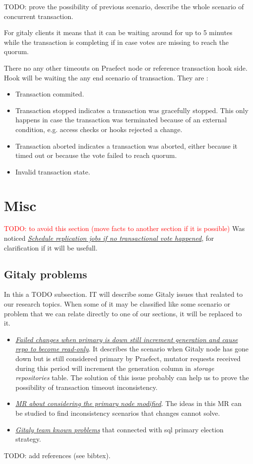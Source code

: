 \documentclass[acmlarge, screen, nonacm]{acmart}
\newcommand{\todo}[1]{\textcolor{red}{TODO: #1}}
\begin{document}
TODO: prove the possibility of previous scenario, describe the whole scenario of concurrent transaction.

For gitaly clients it means that it can be waiting around for up to 5 minutes while the transaction 
is completing if in case votes are missing to reach the quorum.

There no any other timeouts on Praefect node or reference transaction hook side. 
Hook will be waiting the any end scenario of transaction. They are :

\begin{itemize}
\item Transaction commited.
\item Transaction stopped indicates a transaction was gracefully stopped. 
This only happens in case the transaction was terminated because of an external condition, e.g. access checks or hooks rejected a change.
\item Transaction aborted indicates a transaction was aborted, either because it timed out or because the vote failed to reach quorum.
\item Invalid transaction state.
\end{itemize}


\section{Misc}
\todo{to avoid this section (move facts to another section if it is possible)}
  Was noticed
  \emph{\href{https://gitlab.com/gitlab-org/gitaly/-/issues/2466}{Schedule replication jobs if no transactional vote happened}},
  for clarification if it will be usefull.
\subsection{Gitaly problems}
In this a TODO subsection. IT will describe some Gitaly issues that realated to our research topics. When some of 
it may be classified like some scenario or problem that we can relate directly to one of our sections, it will be replaced to it.
\begin{itemize}
\item  \emph{\href{https://gitlab.com/gitlab-org/gitaly/-/issues/3605}{ Failed changes when primary is down still increment 
generation and cause repo to become read-only}}. It describes the scenario when Gitaly node has gone down but is still 
considered primary by Praefect, mutator requests received during this period will increment the generation column 
in \textit{storage repositories} table. The solution of this issue probably can help us to prove the possibility of transaction timeout inconsistency.
\item  \emph{\href{https://gitlab.com/gitlab-org/gitaly/-/merge_requests/3494}{ MR about considering the primary node modified}}. 
The ideas in this MR can be studied to find inconsistency scenarios that changes cannot solve.
\item  \emph{\href{//gitlab.com/gitlab-org/gitaly/-/blob/master/doc/virtual\_storage.md\#known-problems}{Gitaly team known problems}} 
that connected with sql primary election strategy. 
\end{itemize}

TODO: add references (see bibtex).
\end{document}
